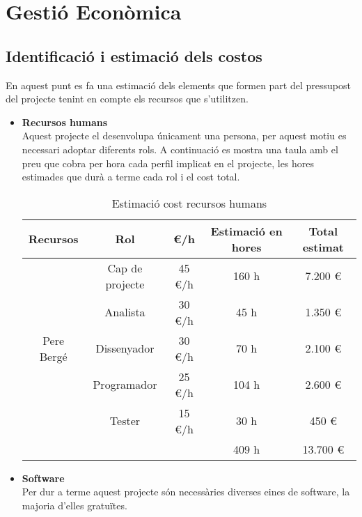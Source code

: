 
\chapter{Gestió Econòmica} %

\label{GestioEconomica} %

\section{Identificació i estimació dels costos}
En aquest punt es fa una estimació dels elements que formen part del pressupost del projecte tenint en compte els recursos que s'utilitzen.

\begin{itemize}
\item{}\textbf{Recursos humans}\\
Aquest projecte el desenvolupa únicament una persona, per aquest motiu
es necessari adoptar diferents rols. A continuació es mostra una taula amb
el preu que cobra per hora cada perfil implicat en el projecte, les hores
estimades que durà a terme cada rol i el cost total.

\begin{table}[!h]
\centering
\begin{tabular}{|c|c|c|c|c|}
\hline
\textbf{Recursos} & \textbf{Rol} & \textbf{\euro/h} & \textbf{Estimació en hores} & \textbf{Total estimat} \\ \hline
& Cap de projecte & 45 \euro/h & 160 h & 7.200 \euro \\ \cline {2-5}
\multicolumn{ 1}{|l|}{} & Analista & 30 \euro/h & 45 h & 1.350 \euro \\ \cline{ 2- 5}
Pere Bergé & Dissenyador & 30 \euro/h & 70 h & 2.100 \euro \\ \cline{ 2- 5}
\multicolumn{ 1}{|l|}{} & Programador & 25 \euro/h & 104 h & 2.600 \euro \\ \cline{ 2- 5}
\multicolumn{ 1}{|l|}{} & Tester & 15 \euro/h & 30 h & 450 \euro \\ \hline
\multicolumn{ 1}{|l|}{} & & & 409 h & 13.700 \euro \\ \hline
\end{tabular}
\label{}
\caption{Estimació cost recursos humans}
\end{table}

\item{}\textbf{Software}\\
Per dur a terme aquest projecte són necessàries diverses eines de software,
la majoria d'elles gratuïtes.


\end{itemize}

